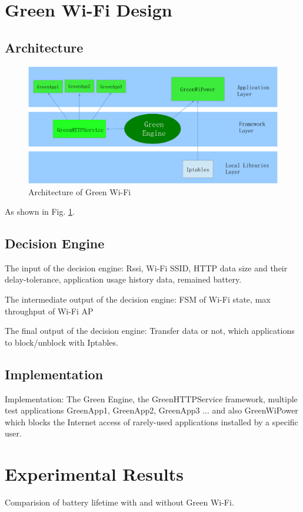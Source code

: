 \documentclass[journal]{IEEEtran}
\begin{document}
\section{Green Wi-Fi Design}

\subsection{Architecture}
\begin{figure}
\centering
\includegraphics[scale=0.35]{architecture.pdf}
\caption{Architecture of Green Wi-Fi}
\label{architecture}
\end{figure}

As shown in Fig. \ref{architecture}.
\subsection{Decision Engine}
The input of the decision engine: Rssi, Wi-Fi SSID, HTTP data size and their delay-tolerance, application usage history data, 
remained battery.

The intermediate output of the decision engine: FSM of Wi-Fi state, max throughput of Wi-Fi AP

The final output of the decision engine: Transfer data or not, which applications to block/unblock with Iptables.
%
%
\subsection{Implementation}
Implementation: The Green Engine, the GreenHTTPService framework, multiple test applications GreenApp1, GreenApp2, GreenApp3 ... and also GreenWiPower which blocks the Internet access of rarely-used applications installed by a specific user.

\section{Experimental Results}
Comparision of battery lifetime with and without Green Wi-Fi.
\end{document}
